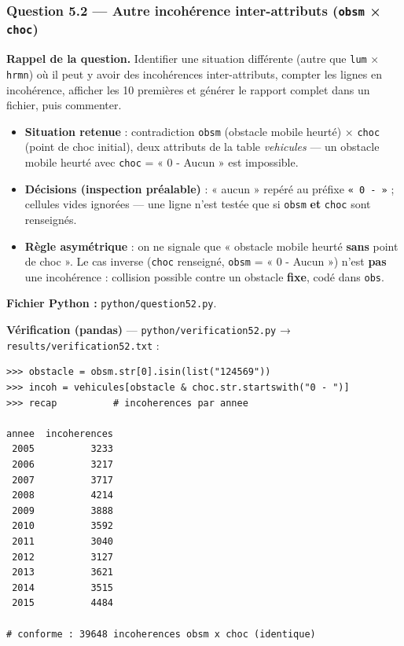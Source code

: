 \documentclass[11pt,a4paper]{article}
\newcommand{\rub}[2]{\textbf{\textcolor{#1}{#2}}}
\begin{document}
\clearpage
\subsubsection*{Question 5.2 — Autre incohérence inter-attributs (\texttt{obsm} × \texttt{choc})}

\rub{labrappel}{Rappel de la question.} Identifier une situation différente (autre que \texttt{lum} × \texttt{hrmn}) où il peut y avoir des incohérences inter-attributs, compter les lignes en incohérence, afficher les 10 premières et générer le rapport complet dans un fichier, puis commenter.

\begin{agentbox}
\begin{itemize}
\item \textbf{Situation retenue} : contradiction \texttt{obsm} (obstacle mobile heurté) × \texttt{choc} (point de choc initial), deux attributs de la table \emph{vehicules} — un obstacle mobile heurté avec \texttt{choc} = « 0 - Aucun » est impossible.
\item \textbf{Décisions (inspection préalable)} : « aucun » repéré au préfixe \texttt{« 0 - »} ; cellules vides ignorées — une ligne n'est testée que si \texttt{obsm} \textbf{et} \texttt{choc} sont renseignés.
\item \textbf{Règle asymétrique} : on ne signale que « obstacle mobile heurté \textbf{sans} point de choc ». Le cas inverse (\texttt{choc} renseigné, \texttt{obsm} = « 0 - Aucun ») n'est \textbf{pas} une incohérence : collision possible contre un obstacle \textbf{fixe}, codé dans \texttt{obs}.
\end{itemize}
\end{agentbox}

\rub{labfichier}{Fichier Python :} \texttt{python/question52.py}.

\rub{labverif}{Vérification (pandas)} --- \texttt{python/verification52.py} → \texttt{results/verification52.txt} :

\begin{lstlisting}[style=pyblock]
>>> obstacle = obsm.str[0].isin(list("124569"))
>>> incoh = vehicules[obstacle & choc.str.startswith("0 - ")]
>>> recap          # incoherences par annee

annee  incoherences
 2005          3233
 2006          3217
 2007          3717
 2008          4214
 2009          3888
 2010          3592
 2011          3040
 2012          3127
 2013          3621
 2014          3515
 2015          4484

# conforme : 39648 incoherences obsm x choc (identique)
\end{lstlisting}
\end{document}
